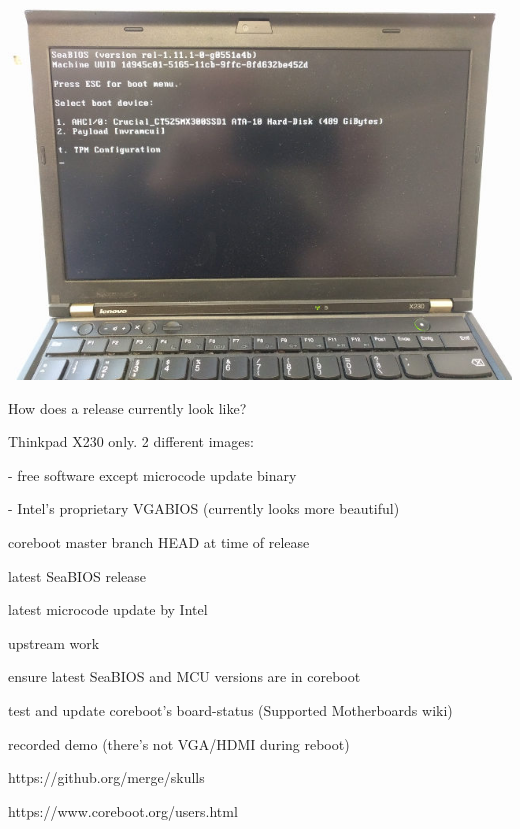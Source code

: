\documentclass[14pt]{beamer}
\begin{document}
\begin{frame}

\includegraphics[width=\textwidth]{seabios}

\end{frame}


\begin{frame}
How does a release currently look like?
\end{frame}


\begin{frame}
Thinkpad X230 only. 2 different images:

- free software except microcode update binary

- Intel's proprietary VGABIOS (currently looks more beautiful)
\pause

coreboot master branch HEAD at time of release

latest SeaBIOS release

latest microcode update by Intel
\end{frame}


\begin{frame}
upstream work
\end{frame}


\begin{frame}
ensure latest SeaBIOS and MCU versions are in coreboot

test and update coreboot's board-status (Supported Motherboards wiki)
\end{frame}


\begin{frame}
recorded demo (there's not VGA/HDMI during reboot)
\end{frame}

\begin{frame}
https://github.org/merge/skulls

https://www.coreboot.org/users.html
\end{frame}
\end{document}
